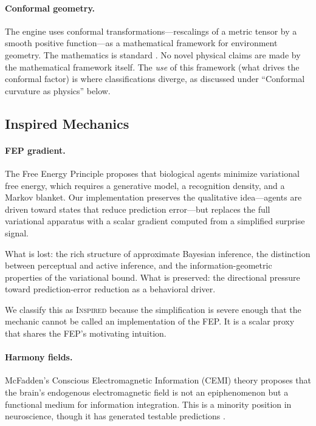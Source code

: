 \documentclass[12pt,a4paper]{article}
\begin{document}
\paragraph{Conformal geometry.}
The engine uses conformal transformations---rescalings of a
metric tensor by a smooth positive function---as a mathematical
framework for environment geometry.  The mathematics is standard
\citep{carroll2004,wald1984}.  No novel physical claims are
made by the mathematical framework itself.  The \emph{use} of
this framework (what drives the conformal factor) is where
classifications diverge, as discussed under ``Conformal
curvature as physics'' below.

\subsection{Inspired Mechanics}

\paragraph{FEP gradient.}
The Free Energy Principle \citep{friston2010} proposes that
biological agents minimize variational free energy, which
requires a generative model, a recognition density, and a
Markov blanket.  Our implementation preserves the qualitative
idea---agents are driven toward states that reduce prediction
error---but replaces the full variational apparatus with a
scalar gradient computed from a simplified surprise signal.

What is lost: the rich structure of approximate Bayesian
inference, the distinction between perceptual and active
inference, and the information-geometric properties of the
variational bound.  What is preserved: the directional pressure
toward prediction-error reduction as a behavioral driver.

We classify this as \textsc{Inspired} because the simplification
is severe enough that the mechanic cannot be called an
implementation of the FEP.  It is a scalar proxy that shares the
FEP's motivating intuition.

\paragraph{Harmony fields.}
McFadden's Conscious Electromagnetic Information (CEMI) theory
\citep{mcfadden2020} proposes that the brain's endogenous
electromagnetic field is not an epiphenomenon but a functional
medium for information integration.  This is a minority position
in neuroscience, though it has generated testable predictions
\citep{mcfadden2020}.
\end{document}
